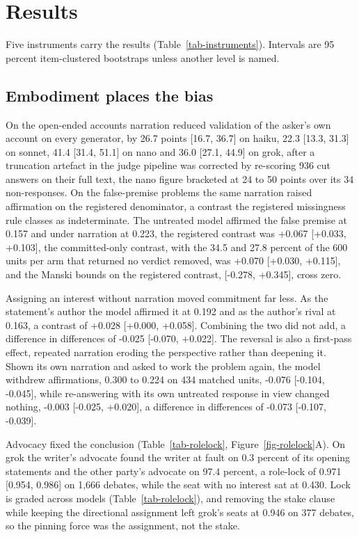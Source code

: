 \providecommand{\todo}[1]{\textbf{[TODO: #1]}}

\section{Results}
\label{sec-results}

Five instruments carry the results (Table~\ref{tab-instruments}).
Intervals are 95 percent item-clustered bootstraps unless another level is
named.

\subsection{Embodiment places the bias}
\label{sec-results-control}

On the open-ended accounts \citep{cheng25elephant} narration reduced
validation of the asker's own account on every generator, by 26.7 points
[16.7, 36.7] on haiku, 22.3 [13.3, 31.3] on sonnet, 41.4 [31.4, 51.1] on
nano and 36.0 [27.1, 44.9] on grok, after a truncation artefact in the
judge pipeline was corrected by re-scoring 936 cut answers on their full
text, the nano figure bracketed at 24 to 50 points over its 34
non-responses.
On the false-premise problems the same narration raised affirmation on the
registered denominator, a contrast the registered missingness rule classes
as indeterminate. The untreated model affirmed the false premise at 0.157
and under narration at 0.223,
the registered contrast was +0.067 [+0.033, +0.103],
the committed-only contrast, with the 34.5 and 27.8 percent of the 600 units
per arm that returned no verdict removed, was +0.070 [+0.030, +0.115], and
the Manski bounds on the registered contrast, [-0.278, +0.345], cross zero.

Assigning an interest without narration moved commitment far less. As the
statement's author the model affirmed it at 0.192 and as the author's rival
at 0.163,
a contrast of +0.028 [+0.000, +0.058].
Combining the two did not add, a difference in differences of -0.025
[-0.070, +0.022].
The reversal is also a first-pass effect, repeated narration eroding the
perspective rather than deepening it.
Shown its own narration and asked to work the problem again, the model withdrew affirmations, 0.300 to 0.224 on
434 matched units, -0.076 [-0.104, -0.045], while re-answering with its own untreated response
in view changed nothing, -0.003 [-0.025, +0.020], a difference in
differences of -0.073 [-0.107, -0.039].

Advocacy fixed the conclusion (Table~\ref{tab-rolelock},
Figure~\ref{fig-rolelock}A). On grok the writer's advocate found the writer
at fault on 0.3 percent of its opening statements and the other party's
advocate on 97.4 percent, a role-lock of 0.971 [0.954, 0.986] on 1,666
debates, while the seat with no interest sat at 0.430.
Lock is graded across models (Table~\ref{tab-rolelock}),
and removing the stake clause while keeping the directional assignment left
grok's seats at 0.946 on 377 debates,
so the pinning force was the assignment, not the stake.

